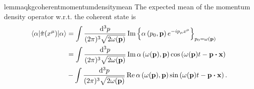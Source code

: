 \begin{restatable}{lemma}{qkgcoherentmomentumdensitymean}\label{thm:qkg_coherent_momentum_density_mean}
	The expected mean of the momentum density operator w.r.t. the coherent state is
	\begin{equation}
		\begin{split}
			\expval{\hat\pi(x^\mu)}{\alpha}
			&=
			\int\frac{\dd[3]{p}}{(2\pi)^3\sqrt{2\omega(\vb{p})}}
			\Im\left\{
				\alpha\left(p_0,\vb{p}\right)
				e^{-ip_\mu x^\mu}	
			\right\}_{p_0=\omega(\vb{p})}
			\\
			&=
			\int\frac{\dd[3]{p}}{(2\pi)^3\sqrt{2\omega(\vb{p})}}
			\Im\alpha\left(\omega(\vb{p}),\vb{p}\right)
			\cos\left(\omega(\vb{p})t-\vb{p}\vdot\vb{x}\right)
			\\
			&-
			\int\frac{\dd[3]{p}}{(2\pi)^3\sqrt{2\omega(\vb{p})}}
			\Re\alpha\left(\omega(\vb{p}),\vb{p}\right)
			\sin\left(\omega(\vb{p})t-\vb{p}\vdot\vb{x}\right)
			.
		\end{split}
	\end{equation}
\end{restatable}

